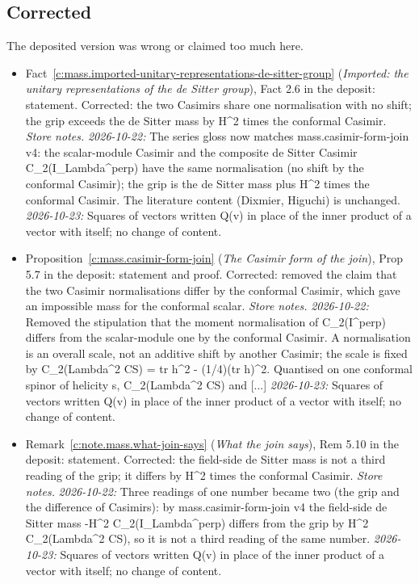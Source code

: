 \documentclass[11pt]{article}
\theoremstyle{definition}
\theoremstyle{plain}
\begin{document}
\subsection*{Corrected}
The deposited version was wrong or claimed too much here.
\begin{itemize}\setlength{\itemsep}{2pt}
\item Fact~\ref{c:mass.imported-unitary-representations-de-sitter-group} (\emph{Imported: the unitary representations of the de Sitter group}), Fact 2.6 in the deposit: statement. Corrected: the two Casimirs share one normalisation with no shift; the grip exceeds the de Sitter mass by H\^{}2 times the conformal Casimir. \emph{Store notes.} \emph{2026-10-22:} The series gloss now matches mass.casimir-form-join v4: the scalar-module Casimir and the composite de Sitter Casimir C\_2(I\_Lambda\^{}perp) have the same normalisation (no shift by the conformal Casimir); the grip is the de Sitter mass plus H\^{}2 times the conformal Casimir. The literature content (Dixmier, Higuchi) is unchanged. \emph{2026-10-23:} Squares of vectors written Q(v) in place of the inner product of a vector with itself; no change of content.
\item Proposition~\ref{c:mass.casimir-form-join} (\emph{The Casimir form of the join}), Prop 5.7 in the deposit: statement and proof. Corrected: removed the claim that the two Casimir normalisations differ by the conformal Casimir, which gave an impossible mass for the conformal scalar. \emph{Store notes.} \emph{2026-10-22:} Removed the stipulation that the moment normalisation of C\_2(I\^{}perp) differs from the scalar-module one by the conformal Casimir. A normalisation is an overall scale, not an additive shift by another Casimir; the scale is fixed by C\_2(Lambda\^{}2 CS) = tr h\^{}2 - (1/4)(tr h)\^{}2. Quantised on one conformal spinor of helicity s, C\_2(Lambda\^{}2 CS) and [...] \emph{2026-10-23:} Squares of vectors written Q(v) in place of the inner product of a vector with itself; no change of content.
\item Remark~\ref{c:note.mass.what-join-says} (\emph{What the join says}), Rem 5.10 in the deposit: statement. Corrected: the field-side de Sitter mass is not a third reading of the grip; it differs by H\^{}2 times the conformal Casimir. \emph{Store notes.} \emph{2026-10-22:} Three readings of one number became two (the grip and the difference of Casimirs): by mass.casimir-form-join v4 the field-side de Sitter mass -H\^{}2 C\_2(I\_Lambda\^{}perp) differs from the grip by H\^{}2 C\_2(Lambda\^{}2 CS), so it is not a third reading of the same number. \emph{2026-10-23:} Squares of vectors written Q(v) in place of the inner product of a vector with itself; no change of content.
\end{itemize}
\end{document}
